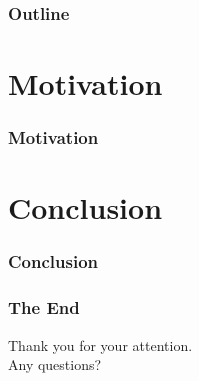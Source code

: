 \documentclass[14pt]{beamer}
\institute{Universit\"at Hamburg\\\trinstitute}
\title{\trtitle}
\subtitle{\trtype}
\author{\trauthor}
\date{}
\theoremstyle{remark}
\begin{document}
\renewcommand{\arraystretch}{1.2}

\begin{frame}[plain] %
  \titlepage
\end{frame}

\begin{frame}
	\frametitle{Outline}
	\tableofcontents
\end{frame}


\section{Motivation}
\begin{frame}
	\frametitle{Motivation}
\end{frame}

\section{Conclusion}
\begin{frame}
  \frametitle{Conclusion}
\end{frame}


\begin{frame}
	\frametitle{The End}
	\begin{center}
		Thank you for your attention.\\[1ex]
		Any questions?\\[5ex]
	\end{center}
\end{frame}
\end{document}
